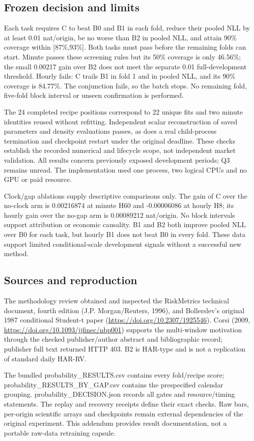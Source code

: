 \documentclass[10pt,a4paper]{article}
\begin{document}
\subsection{Frozen decision and limits}\label{frozen-decision-and-limits}

Each task requires C to beat B0 and B1 in each fold, reduce their pooled NLL by at least 0.01 nat/origin, be no worse than B2 in pooled NLL, and attain 90\% coverage within {[}87\%,93\%{]}. Both tasks must pass before the remaining folds can start. Minute passes these screening rules but its 50\% coverage is only 46.56\%; the small 0.00217 gain over B2 does not meet the separate 0.01 full-development threshold. Hourly fails: C trails B1 in fold 1 and in pooled NLL, and its 90\% coverage is 84.77\%. The conjunction fails, so the batch stops. No remaining fold, five-fold block interval or unseen confirmation is performed.

The 24 completed recipe positions correspond to 22 unique fits and two minute identities reused without refitting. Independent scalar reconstruction of saved parameters and density evaluations passes, as does a real child-process termination and checkpoint restart under the original deadline. These checks establish the recorded numerical and lifecycle scope, not independent market validation. All results concern previously exposed development periods; Q3 remains unread. The implementation used one process, two logical CPUs and no GPU or paid resource.

Clock/gap ablations supply descriptive comparisons only. The gain of C over the no-clock arm is 0.00216874 at minute H60 and -0.00006086 at hourly H8; its hourly gain over the no-gap arm is 0.00089212 nat/origin. No block intervals support attribution or economic causality. B1 and B2 both improve pooled NLL over B0 for each task, but hourly B1 does not beat B0 in every fold. These data support limited conditional-scale development signals without a successful new method.

\subsection{Sources and reproduction}\label{sources-and-reproduction}

The methodology review obtained and inspected the RiskMetrics technical document, fourth edition (J.P. Morgan/Reuters, 1996), and Bollerslev's original 1987 conditional Student-t paper (\url{https://doi.org/10.2307/1925546}). Corsi (2009, \url{https://doi.org/10.1093/jjfinec/nbp001}) supports the multi-window motivation through the checked publisher/author abstract and bibliographic record; publisher full text returned HTTP 403. B2 is HAR-type and is not a replication of standard daily HAR-RV.

The bundled probability\_RESULTS.csv contains every fold/recipe score; probability\_RESULTS\_BY\_GAP.csv contains the prespecified calendar grouping. probability\_DECISION.json records all gates and resource/timing statements. The replay and recovery receipts define their exact checks. Raw bars, per-origin scientific arrays and checkpoints remain external dependencies of the original experiment. This addendum provides result documentation, not a portable raw-data retraining capsule.
\end{document}
